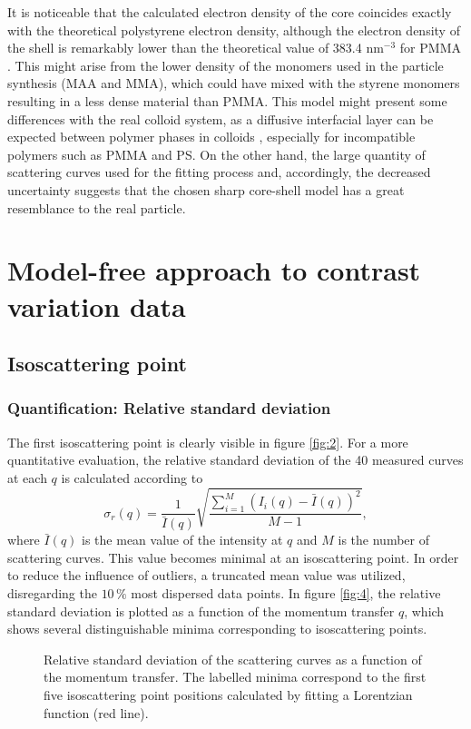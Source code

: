 It is noticeable that the calculated electron density of the core coincides exactly with the theoretical polystyrene electron density, although the electron density of the shell is remarkably lower than the theoretical value of 383.4 nm\(^{-3}\) for PMMA \citet{Ballauff2001}. This might arise from the lower density of the monomers used in the particle synthesis (MAA and MMA), which could have mixed with the styrene monomers resulting in a less dense material than PMMA. This model might present some differences with the real colloid system, as a diffusive interfacial layer can be expected between polymer phases in colloids \citet{Dingenouts1994}, especially for incompatible polymers such as PMMA and PS. On the other hand, the large quantity of scattering curves used for the fitting process and, accordingly, the decreased uncertainty suggests that the chosen sharp core-shell model has a great resemblance to the real particle.

\section{Model-free approach to contrast variation data}
\subsection{Isoscattering point}
\subsubsection{Quantification: Relative standard deviation}
The first isoscattering point is clearly visible in figure \ref{fig:2}. For a more quantitative evaluation, the relative standard deviation of the 40 measured curves at each \(q\) is calculated according to
\begin{equation}
\sigma_r (q)=\frac{1}{\bar{I}(q)}\sqrt{\frac{\sum^{M}_{i=1} (I_i(q) -\bar{I} (q))^2 }{M-1}} ,
\end{equation}
where \(\bar{I} (q)\) is the mean value of the intensity at \(q\) and \( M \) is the number of scattering curves. This value becomes minimal at an isoscattering point. In order to reduce the influence of outliers, a truncated mean value was utilized, disregarding the \(10\,\%\) most dispersed data points. In figure \ref{fig:4}, the relative standard deviation is plotted as a function of the momentum transfer \(q\), which shows several distinguishable minima corresponding to isoscattering points.

\begin{figure}%
	\centering
		
		\caption{Relative standard deviation of the scattering curves as a function of the momentum transfer. The labelled minima correspond to the first five isoscattering point positions calculated by fitting a Lorentzian function (red line).}
		\label{fig:KiskerIsopoint}
\end{figure}

